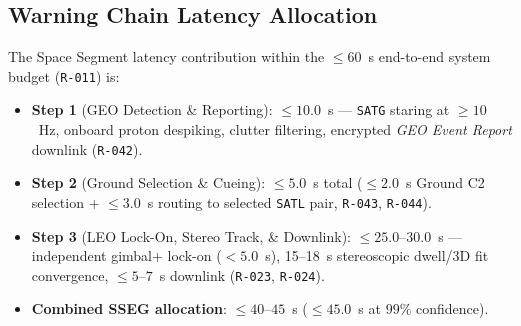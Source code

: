 \subsection{Warning Chain Latency Allocation}

The Space Segment latency contribution within the $\le 60$~s end-to-end system budget (\texttt{R-011}) is:
\begin{itemize}
    \item \textbf{Step 1} (GEO Detection \& Reporting): $\le 10.0$~s --- \texttt{SATG}  staring at $\ge 10$~Hz, onboard proton despiking, clutter filtering, encrypted \emph{GEO Event Report} downlink (\texttt{R-042}).
    \item \textbf{Step 2} (Ground Selection \&  Cueing): $\le 5.0$~s total ($\le 2.0$~s Ground C2 selection + $\le 3.0$~s   routing to selected \texttt{SATL} pair, \texttt{R-043}, \texttt{R-044}).
    \item \textbf{Step 3} (LEO Lock-On, Stereo Track, \& Downlink): $\le 25.0$--$30.0$~s --- independent gimbal+ lock-on ($< 5.0$~s), 15--18~s stereoscopic dwell/3D fit convergence, $\le 5$--$7$~s downlink (\texttt{R-023}, \texttt{R-024}).
    \item \textbf{Combined SSEG allocation}: $\le 40$--$45$~s ($\le 45.0$~s at $99\%$ confidence).
\end{itemize}
